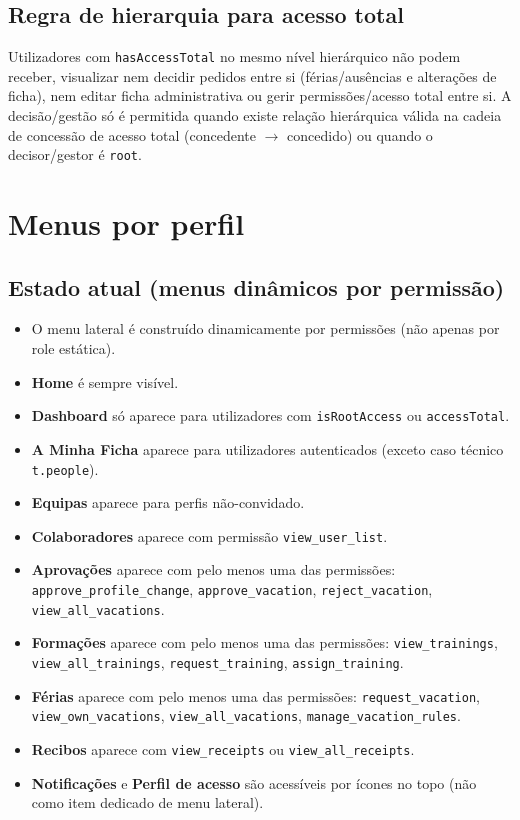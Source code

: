 \documentclass[11pt,a4paper]{article}
\begin{document}
\subsection{Regra de hierarquia para acesso total}

Utilizadores com \texttt{hasAccessTotal} no mesmo nível hierárquico não podem receber, visualizar nem decidir pedidos entre si (férias/ausências e alterações de ficha), nem editar ficha administrativa ou gerir permissões/acesso total entre si. A decisão/gestão só é permitida quando existe relação hierárquica válida na cadeia de concessão de acesso total (concedente $\rightarrow$ concedido) ou quando o decisor/gestor é \texttt{root}.

\section{Menus por perfil}

\subsection{Estado atual (menus dinâmicos por permissão)}
\begin{itemize}
  \item O menu lateral é construído dinamicamente por permissões (não apenas por role estática).
  \item \textbf{Home} é sempre visível.
  \item \textbf{Dashboard} só aparece para utilizadores com \texttt{isRootAccess} ou \texttt{accessTotal}.
  \item \textbf{A Minha Ficha} aparece para utilizadores autenticados (exceto caso técnico \texttt{t.people}).
  \item \textbf{Equipas} aparece para perfis não-convidado.
  \item \textbf{Colaboradores} aparece com permissão \texttt{view\_user\_list}.
  \item \textbf{Aprovações} aparece com pelo menos uma das permissões: \texttt{approve\_profile\_change}, \texttt{approve\_vacation}, \texttt{reject\_vacation}, \texttt{view\_all\_vacations}.
  \item \textbf{Formações} aparece com pelo menos uma das permissões: \texttt{view\_trainings}, \texttt{view\_all\_trainings}, \texttt{request\_training}, \texttt{assign\_training}.
  \item \textbf{Férias} aparece com pelo menos uma das permissões: \texttt{request\_vacation}, \texttt{view\_own\_vacations}, \texttt{view\_all\_vacations}, \texttt{manage\_vacation\_rules}.
  \item \textbf{Recibos} aparece com \texttt{view\_receipts} ou \texttt{view\_all\_receipts}.
  \item \textbf{Notificações} e \textbf{Perfil de acesso} são acessíveis por ícones no topo (não como item dedicado de menu lateral).
\end{itemize}
\end{document}

